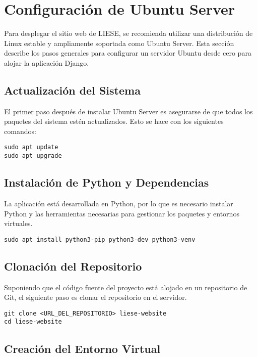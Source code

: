 \chapter{Configuración de Ubuntu Server}
\label{ch:ubuntu_server}

Para desplegar el sitio web de LIESE, se recomienda utilizar una distribución de Linux estable y ampliamente soportada como Ubuntu Server. Esta sección describe los pasos generales para configurar un servidor Ubuntu desde cero para alojar la aplicación Django.

\section{Actualización del Sistema}

El primer paso después de instalar Ubuntu Server es asegurarse de que todos los paquetes del sistema estén actualizados. Esto se hace con los siguientes comandos:

\begin{verbatim}
sudo apt update
sudo apt upgrade
\end{verbatim}

\section{Instalación de Python y Dependencias}

La aplicación está desarrollada en Python, por lo que es necesario instalar Python y las herramientas necesarias para gestionar los paquetes y entornos virtuales.

\begin{verbatim}
sudo apt install python3-pip python3-dev python3-venv
\end{verbatim}

\section{Clonación del Repositorio}

Suponiendo que el código fuente del proyecto está alojado en un repositorio de Git, el siguiente paso es clonar el repositorio en el servidor.

\begin{verbatim}
git clone <URL_DEL_REPOSITORIO> liese-website
cd liese-website
\end{verbatim}

\section{Creación del Entorno Virtual}

